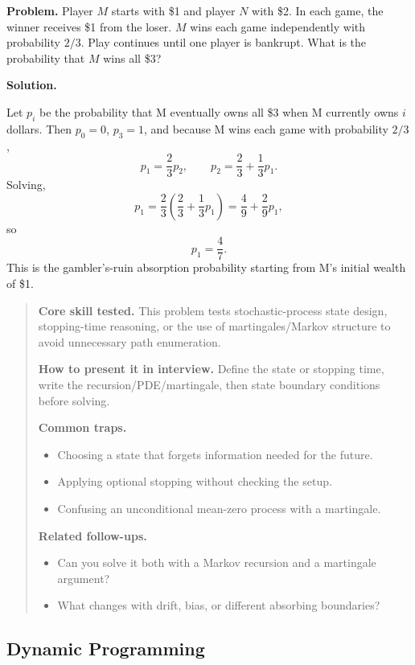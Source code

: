 \documentclass[11pt,letterpaper,openany]{book}
\newenvironment{EditorialNote}
  {\begin{quote}\small\setlength{\parskip}{0.25em}}
  {\end{quote}}
\newcommand{\QuestionSpacer}{\vspace{0.4em}}
\begin{document}
\textbf{Problem.} Player \(M\) starts with \$1 and player \(N\) with \$2. In each game, the winner receives \$1 from the loser. \(M\) wins each game independently with probability \(2/3\). Play continues until one player is bankrupt. What is the probability that \(M\) wins all \$3?


\textbf{Solution.}

Let \(p_i\) be the probability that M eventually owns all \$3 when M currently owns \(i\) dollars. Then \(p_0=0\), \(p_3=1\), and because M wins each game with probability \(2/3\),
\[
p_1=\frac23p_2,\qquad
p_2=\frac23+\frac13p_1.
\]
Solving,
\[
p_1=\frac23\left(\frac23+\frac13p_1\right)
=\frac49+\frac29p_1,
\]
so
\[
\boxed{p_1=\frac47}.
\]
This is the gambler's-ruin absorption probability starting from M's initial wealth of \$1.


\begin{EditorialNote}


\textbf{Core skill tested.} This problem tests stochastic-process state design, stopping-time reasoning, or the use of martingales/Markov structure to avoid unnecessary path enumeration.


\textbf{How to present it in interview.} Define the state or stopping time, write the recursion/PDE/martingale, then state boundary conditions before solving.


\textbf{Common traps.}
\begin{itemize}
\item Choosing a state that forgets information needed for the future.
\item Applying optional stopping without checking the setup.
\item Confusing an unconditional mean-zero process with a martingale.
\end{itemize}


\textbf{Related follow-ups.}
\begin{itemize}
\item Can you solve it both with a Markov recursion and a martingale argument?
\item What changes with drift, bias, or different absorbing boundaries?
\end{itemize}


\end{EditorialNote}
\QuestionSpacer

\subsection{Dynamic Programming}
\end{document}
